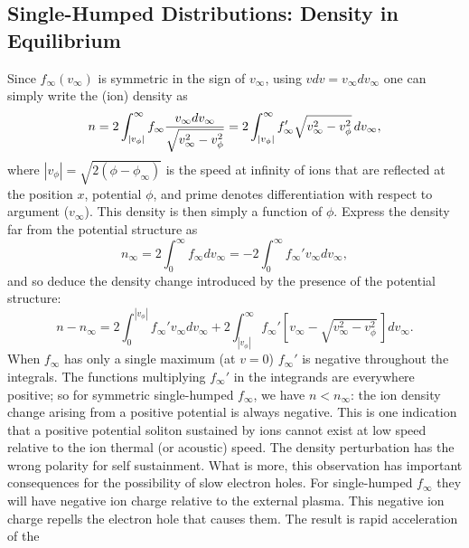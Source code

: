 \documentclass[12pt]{article}
\begin{document}
\subsection{Single-Humped Distributions: Density in Equilibrium}

Since $f_\infty(v_\infty)$ is symmetric in the sign of $v_\infty$,
using $vdv=v_\infty dv_\infty$ one can simply write the (ion) density
as
\begin{equation}
\label{symden}
  n = 2\int_{|v_\phi|}^\infty f_\infty {v_\infty dv_\infty\over
    \sqrt{v_\infty^2-v_\phi^2} }  
  = 2\int_{|v_\phi|}^\infty f_\infty'\sqrt{v_\infty^2-v_\phi^2}\,
  dv_\infty,
\end{equation}
where $|v_\phi|=\sqrt{2(\phi-\phi_\infty)}$ is the speed at infinity
of ions that are reflected at the position $x$, potential $\phi$, and
prime denotes differentiation with respect to argument
($v_\infty$). This density is then simply a function of $\phi$.
Express the density far from the potential structure as
\begin{equation}
n_\infty=2\int_0^\infty f_\infty dv_\infty=-2\int_0^\infty f_\infty'
v_\infty dv_\infty,
\end{equation}
and so deduce the density change introduced by the presence of the
potential structure:
\begin{equation}
  n-n_\infty=2\int_0^{|v_\phi|}f_\infty'v_\infty dv_\infty +
  2\int_{|v_\phi|}^{\infty}f_\infty'\left[v_\infty-\sqrt{v_\infty^2-v_\phi^2}\,\right] dv_\infty.
\end{equation}
When $f_\infty$ has only a single maximum (at $v=0$) $f_\infty'$ is
negative throughout the integrals. The functions multiplying
$f_\infty'$ in the integrands are everywhere positive; so for
symmetric single-humped $f_\infty$, we have $n<n_\infty$: the ion
density change arising from a positive potential is always
negative. This is one indication that a positive potential soliton
sustained by ions cannot exist at low speed relative to the ion
thermal (or acoustic) speed. The density perturbation has the wrong
polarity for self sustainment. What is more, this observation has
important consequences for the possibility of slow electron holes.
For single-humped $f_\infty$ they will have negative ion charge
relative to the external plasma. This negative ion charge repells
the electron
hole that causes them. The result is rapid acceleration of the
\end{document}
